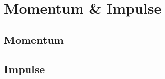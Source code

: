 \documentclass[../maths.tex]{subfiles}
\begin{document}
\chapter{Momentum \& Impulse}
\section{Momentum}
\section{Impulse}
\end{document}

